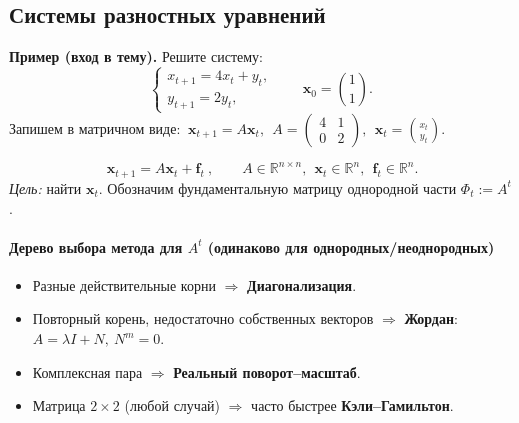 \subsection{Системы разностных уравнений}\label{subsec:systems}

\textbf{Пример (вход в тему).} Решите систему:
\[
\begin{cases}
x_{t+1} = 4x_t + y_t,\\
y_{t+1} = 2y_t,
\end{cases}
\qquad \mathbf{x}_0=\binom{1}{1}.
\]
Запишем в матричном виде: \(\ \mathbf{x}_{t+1}=A\mathbf{x}_t,\ \ A=\begin{pmatrix}4&1\\[2pt]0&2\end{pmatrix},\ \ \mathbf{x}_t=\binom{x_t}{y_t}.\)

\[
\boxed{\ \mathbf{x}_{t+1}=A\mathbf{x}_t+\mathbf{f}_t\ },\qquad
A\in\mathbb{R}^{n\times n},\ \ \mathbf{x}_t\in\mathbb{R}^n,\ \ \mathbf{f}_t\in\mathbb{R}^n.
\]
\emph{Цель:} найти \(\mathbf{x}_t\). Обозначим фундаментальную матрицу однородной части \(\Phi_t:=A^t\).


\paragraph{Дерево выбора метода для \(A^t\) (одинаково для однородных/неоднородных)}
\begin{itemize}
  \item Разные действительные корни \(\Rightarrow\) \textbf{Диагонализация}.
  \item Повторный корень, недостаточно собственных векторов \(\Rightarrow\) \textbf{Жордан}: \(A=\lambda I+N,\ N^m=0\).
  \item Комплексная пара \(\Rightarrow\) \textbf{Реальный поворот–масштаб}.
  \item Матрица \(2\times 2\) (любой случай) \(\Rightarrow\) часто быстрее \textbf{Кэли–Гамильтон}.
\end{itemize}

